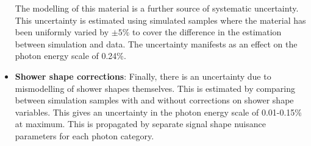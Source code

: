 \begin{itemize}[noitemsep]
{           The modelling of this material is a further source of systematic uncertainty. 
           This uncertainty is estimated using simulated samples where the material has been uniformly varied by $\pm5\%$ to cover the difference in the estimation between simulation and data.
           The uncertainty manifests as an effect on the photon energy scale of 0.24\%.
           }
    \item {\textbf{Shower shape corrections}: 
           Finally, there is an uncertainty due to mismodelling of shower shapes themselves. This is estimated by comparing between simulation samples with and without corrections on shower shape variables. This gives an uncertainty in the photon energy scale of 0.01-0.15\% at maximum. This is propagated by separate signal shape nuisance parameters for each photon category.  
           }
\end{itemize}

